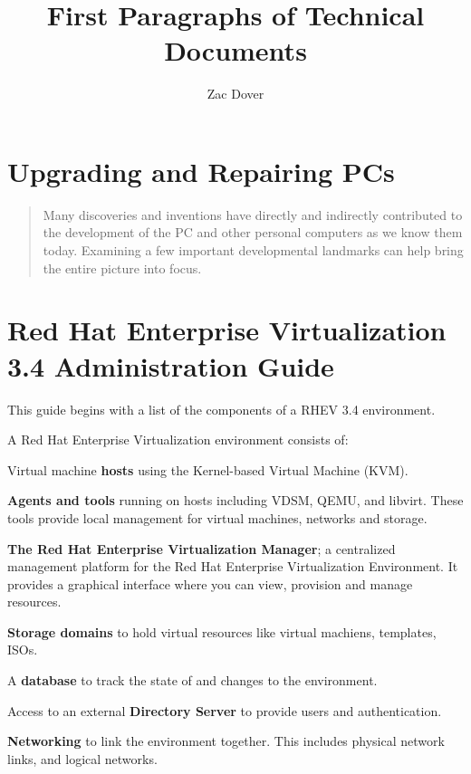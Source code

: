 \documentclass{article}
\title{First Paragraphs of Technical Documents}
\author{Zac Dover}
\begin{document}
\maketitle

\section{Upgrading and Repairing PCs}
\begin{quotation}
Many discoveries and inventions have directly and indirectly contributed to the development of the PC and other personal computers as we know them today. Examining a few important developmental landmarks can help bring the entire picture into focus.
\end{quotation}

\section{Red Hat Enterprise Virtualization 3.4 Administration Guide}
This guide begins with a list of the components of a RHEV 3.4 environment.
\begin{displayquote}
{\tiny A Red Hat Enterprise Virtualization environment consists of:}
\begin{itemize}
{\tiny  \item Virtual machine \textbf{hosts} using the Kernel-based Virtual Machine (KVM).}
{\tiny  \item \textbf{Agents and tools} running on hosts including VDSM, QEMU, and libvirt. These tools provide local management for virtual machines, networks and storage.}
{\tiny  \item \textbf{The Red Hat Enterprise Virtualization Manager}; a centralized management platform for the Red Hat Enterprise Virtualization Environment. It provides a graphical interface where you can view, provision and manage resources.}
{\tiny  \item \textbf{Storage domains} to hold virtual resources like virtual machiens, templates, ISOs.}
{\tiny  \item A \textbf{database} to track the state of and changes to the environment.}
{\tiny  \item Access to an external \textbf{Directory Server} to provide users and authentication.}
{\tiny  \item \textbf{Networking} to link the environment together. This includes physical network links, and logical networks.}
\end{itemize}
\end{displayquote}
\end{document}
